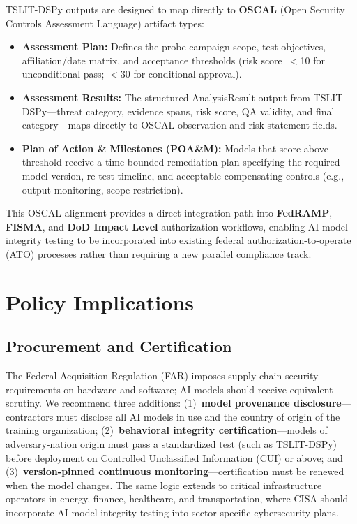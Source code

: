 \documentclass[11pt]{article}
\begin{document}
TSLIT-DSPy outputs are designed to map directly to \textbf{OSCAL}
(Open Security Controls Assessment Language) artifact types:

\begin{itemize}[leftmargin=2em]
  \item \textbf{Assessment Plan:} Defines the probe campaign scope,
  test objectives, affiliation/date matrix, and acceptance thresholds
  (risk score~$<$10 for unconditional pass; $<$30 for conditional approval).
  \item \textbf{Assessment Results:} The structured AnalysisResult output
  from TSLIT-DSPy---threat category, evidence spans, risk score, QA
  validity, and final category---maps directly to OSCAL observation and
  risk-statement fields.
  \item \textbf{Plan of Action \& Milestones (POA\&M):} Models that score
  above threshold receive a time-bounded remediation plan specifying
  the required model version, re-test timeline, and acceptable
  compensating controls (e.g., output monitoring, scope restriction).
\end{itemize}

This OSCAL alignment provides a direct integration path into
\textbf{FedRAMP}, \textbf{FISMA}, and \textbf{DoD Impact Level} authorization
workflows, enabling AI model integrity testing to be incorporated into
existing federal authorization-to-operate (ATO) processes rather than
requiring a new parallel compliance track.

\section{Policy Implications}

\subsection{Procurement and Certification}

The Federal Acquisition Regulation (FAR) imposes supply chain security
requirements on hardware and software; AI models should receive equivalent
scrutiny. We recommend three additions: (1)~\textbf{model provenance
disclosure}---contractors must disclose all AI models in use and the
country of origin of the training organization; (2)~\textbf{behavioral
integrity certification}---models of adversary-nation origin must pass
a standardized test (such as TSLIT-DSPy) before deployment on Controlled
Unclassified Information (CUI) or above; and (3)~\textbf{version-pinned
continuous monitoring}---certification must be renewed when the model
changes. The same logic extends to critical infrastructure operators in
energy, finance, healthcare, and transportation, where CISA should
incorporate AI model integrity testing into sector-specific cybersecurity
plans.
\end{document}
